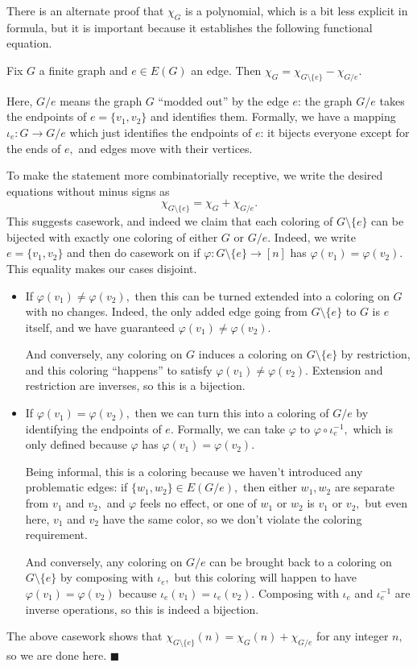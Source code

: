 There is an alternate proof that $\chi_G$ is a polynomial, which is a bit less explicit in formula, but it is important because it establishes the following functional equation.
\begin{lemma}
    Fix $G$ a finite graph and $e\in E(G)$ an edge. Then $\chi_G=\chi_{G\setminus\{e\}}-\chi_{G/e}.$
\end{lemma}
Here, $G/e$ means the graph $G$ ``modded out'' by the edge $e$: the graph $G/e$ takes the endpoints of $e=\{v_1,v_2\}$ and identifies them. Formally, we have a mapping $\iota_e:G\to G/e$ which just identifies the endpoints of $e$: it bijects everyone except for the ends of $e,$ and edges move with their vertices.

To make the statement more combinatorially receptive, we write the desired equations without minus signs as
\[\chi_{G\setminus\{e\}}=\chi_G+\chi_{G/e}.\]
This suggests casework, and indeed we claim that each coloring of $G\setminus\{e\}$ can be bijected with exactly one coloring of either $G$ or $G/e.$ Indeed, we write $e=\{v_1,v_2\}$ and then do casework on if $\varphi:G\setminus\{e\}\to[n]$ has $\varphi(v_1)=\varphi(v_2).$ This equality makes our cases disjoint.
\begin{itemize}
    \item If $\varphi(v_1)\ne\varphi(v_2),$ then this can be turned extended into a coloring on $G$ with no changes. Indeed, the only added edge going from $G\setminus\{e\}$ to $G$ is $e$ itself, and we have guaranteed $\varphi(v_1)\ne\varphi(v_2).$
    
    And conversely, any coloring on $G$ induces a coloring on $G\setminus\{e\}$ by restriction, and this coloring ``happens'' to satisfy $\varphi(v_1)\ne\varphi(v_2).$ Extension and restriction are inverses, so this is a bijection.
    \item If $\varphi(v_1)=\varphi(v_2),$ then we can turn this into a coloring of $G/e$ by identifying the endpoints of $e.$ Formally, we can take $\varphi$ to $\varphi\circ\iota_e^{-1},$ which is only defined because $\varphi$ has $\varphi(v_1)=\varphi(v_2).$
    
    Being informal, this is a coloring because we haven't introduced any problematic edges: if $\{w_1,w_2\}\in E(G/e),$ then either $w_1,w_2$ are separate from $v_1$ and $v_2,$ and $\varphi$ feels no effect, or one of $w_1$ or $w_2$ is $v_1$ or $v_2,$ but even here, $v_1$ and $v_2$ have the same color, so we don't violate the coloring requirement.
    
    And conversely, any coloring on $G/e$ can be brought back to a coloring on $G\setminus\{e\}$ by composing with $\iota_{e},$ but this coloring will happen to have $\varphi(v_1)=\varphi(v_2)$ because $\iota_e(v_1)=\iota_e(v_2).$ Composing with $\iota_e$ and $\iota_e^{-1}$ are inverse operations, so this is indeed a bijection.
\end{itemize}
The above casework shows that $\chi_{G\setminus\{e\}}(n)=\chi_G(n)+\chi_{G/e}$ for any integer $n,$ so we are done here. $\blacksquare$

